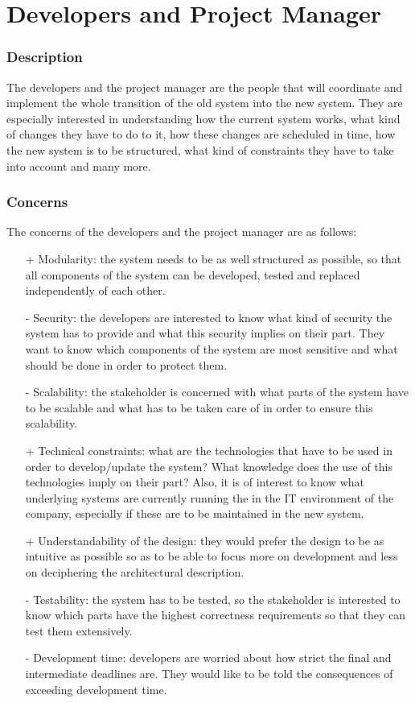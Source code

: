 \section{Developers and Project Manager}

\subsubsection{Description}
The developers and the project manager are the people that will
coordinate and implement the whole transition of the old system into the new system.
They are especially interested in understanding how the current system
works, what kind of changes they have to do to it, how these changes are
scheduled in time, how the new system is to be structured, what kind of
constraints they have to take into account and many more.

\subsubsection{Concerns}
The concerns of the developers and the project manager are as follows:
\begin{itemize}
\item[+] Modularity: the system needs to be as well structured as possible, so
that all components of the system can be developed, tested and replaced
independently of each other.
\item[-] Security: the developers are interested to know what kind of security
the system has to provide and what this security implies on their part. They
want to know which components of the system are most sensitive and what
should be done in order to protect them.
\item[-] Scalability: the stakeholder is concerned with what parts of the
system have to be scalable and what has to be taken care of in order to
ensure this scalability.
\item[+] Technical constraints: what are the technologies that have to be used
in order to develop/update the system? What knowledge does the use of this
technologies imply on their part? Also, it is of interest to know what underlying
systems are currently running the in the IT environment of the company, especially
if these are to be maintained in the new system.
\item[+] Understandability of the design: they would prefer the design to be
as intuitive as possible so as to be able to focus more on development and less
on deciphering the architectural description.
\item[-] Testability: the system has to be tested, so the stakeholder is interested
to know which parts have the highest correctness requirements so that they
can test them extensively.
\item[-] Development time: developers are worried about how strict the final
and intermediate deadlines are. They would like to be told the consequences of
exceeding development time.
\end{itemize}

